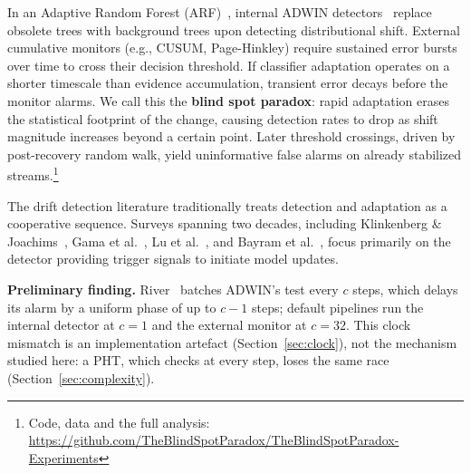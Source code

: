 \documentclass[10pt,conference]{IEEEtran}
\theoremstyle{definition}
\begin{document}
In an Adaptive Random Forest (ARF)~\cite{gomes_arf_2017}, internal ADWIN detectors~\cite{bifet_adwin_2007} replace obsolete trees with background trees upon detecting distributional shift. External cumulative monitors (e.g., CUSUM, Page-Hinkley) require sustained error bursts over time to cross their decision threshold. If classifier adaptation operates on a shorter timescale than evidence accumulation, transient error decays before the monitor alarms. We call this the \textbf{blind spot paradox}: rapid adaptation erases the statistical footprint of the change, causing detection rates to drop as shift magnitude increases beyond a certain point. Later threshold crossings, driven by post-recovery random walk, yield uninformative false alarms on already stabilized streams.\footnote{Code, data and the full analysis: \url{https://github.com/TheBlindSpotParadox/TheBlindSpotParadox-Experiments}}

The drift detection literature traditionally treats detection and adaptation as a cooperative sequence.
Surveys spanning two decades, including Klinkenberg \& Joachims~\cite{klinkenberg_2000}, Gama et al.~\cite{gama_survey_2014}, Lu et al.~\cite{lu_concept_drift_2018}, and Bayram et al.~\cite{bayram_2022}, focus primarily on the detector providing trigger signals to initiate model updates.

\noindent\textbf{Preliminary finding.} River~\cite{montiel_river_2021} batches ADWIN's test every $c$ steps, which delays its alarm by a uniform phase of up to $c - 1$ steps; default pipelines run the internal detector at $c = 1$ and the external monitor at $c = 32$. This clock mismatch is an implementation artefact (Section~\ref{sec:clock}), not the mechanism studied here: a PHT, which checks at every step, loses the same race (Section~\ref{sec:complexity}).
\end{document}
